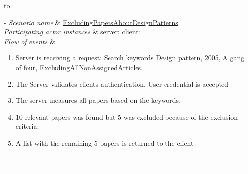 %
%
\begin{table}[h!]

	\tabulinesep=1.5mm
	
	\begin{tabu} to 
	
		\tabucline[1.5pt]-
		\textit{Scenario name} & \underline{ExcludingPapersAboutDesignPatterns} \\
		\hline
		\textit{Participating actor \newline instances} & \underline{server:\serverside}
		\newline \underline{client:\clientside} \\
		\hline
		\textit{Flow of events} &
		\vspace{-3mm}
		
		\begin{enumerate}[leftmargin=*,topsep=0pt,itemsep=-1ex]
		
			\item Server is receiving a request: Search keywords {Design pattern, 2005, A gang of four}, Excluding{AllNonAssignedArticles}.
			
			\item The Server validates clients authentication. User credential is accepted
			
			\item The server measures all papers based on the keywords.
			
			\item 10 relevant papers was found but 5 was excluded because of the exclusion criteria.
			
			\item A list with the remaining 5 papers is returned to the client\\				
		\end{enumerate} \\
		
		\tabucline[1.5pt]-
		
	\end{tabu}
	
	\caption{Scenario when a user wants to exclude some papers.}
	\label{sc:ExcludingPapersAboutDesignPatterns}
	
\end{table}

